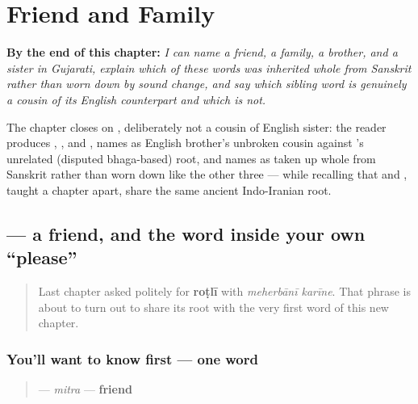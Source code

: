 
\chapter{Friend and Family}
\label{ch:gu-friend-and-family}

\begin{chapteropening}
\textbf{By the end of this chapter:} \emph{I can name a friend, a family, a brother, and a sister in Gujarati, explain which of these words was inherited whole from Sanskrit rather than worn down by sound change, and say which sibling word is genuinely a cousin of its English counterpart and which is not.}

The chapter closes on , deliberately not a cousin of English sister: the reader produces , ,  and , names  as English brother's unbroken cousin against 's unrelated (disputed bhaga-based) root, and names  as taken up whole from Sanskrit rather than worn down like the other three — while recalling that  and , taught a chapter apart, share the same ancient Indo-Iranian root.
\end{chapteropening}

\section[\texorpdfstring{\gu{મિત્ર} (mitra)}{મિત્ર (mitra)}]{ — a friend, and the word inside your own \textquotedblleft{}please\textquotedblright{}}

\label{lesson:GU-C11-mitra}



\begin{quote}
Last chapter asked politely for \textbf{roṭlī} with \emph{meherbānī karīne}. That phrase is about to turn out to share its root with the very first word of this new chapter.
\end{quote}

\subsection*{You'll want to know first — one word}
\begin{quote}
\textbf{} — \emph{mitra} — \textbf{friend}
\end{quote}

